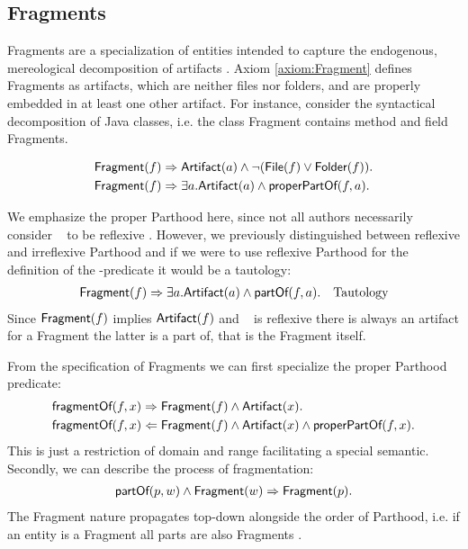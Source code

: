 \subsection{Fragments}
\label{subsection:Fragments}
\Glspl{Fragment} are a specialization of entities intended to capture the endogenous, mereological decomposition of artifacts \cite{HeinzLV17}.
Axiom \ref{axiom:Fragment} defines  \glspl{Fragment} as artifacts, which are neither files nor folders, and are properly embedded in at least one other artifact.
For instance, consider the syntactical decomposition of \gls{Java} classes, i.e. the class \gls{Fragment} contains method and field \glspl{Fragment}.
\begin{axiom}[\Fragment]
\label{axiom:Fragment}
\begin{align*}
&\textsf{Fragment}(f) 
\Rightarrow
\textsf{Artifact}(a) \wedge \neg(\textsf{File}(f) \vee \textsf{Folder}(f)).\\
&\textsf{Fragment}(f) 
\Rightarrow 
\exists a.\textsf{Artifact}(a) \wedge \textsf{properPartOf}(f,a).
\end{align*}
\end{axiom}
We emphasize the proper \gls{Parthood} here, since not all authors necessarily consider \partOf~ to be reflexive \cite{DBLP:conf/sle/Lammel16} \cite{HeinzLV17}.
However, we previously distinguished between reflexive and irreflexive \gls{Parthood} and if we were to use reflexive \gls{Parthood} for the definition of the \Fragment-predicate it would be a tautology:
\begin{align*}
&\textsf{Fragment}(f) 
\Rightarrow 
\exists a.\textsf{Artifact}(a) \wedge \textsf{partOf}(f,a).
&\text{Tautology}
\end{align*}
Since $\textsf{Fragment}(f)$ implies $\textsf{Artifact}(f)$ and \partOf~ is reflexive there is always an artifact for a \gls{Fragment} the latter is a part of, that is the \gls{Fragment} itself.

From the specification of \glspl{Fragment} we can first specialize the proper \gls{Parthood} predicate:
\begin{align*}
&\textsf{fragmentOf}(f,x) 
\Rightarrow
\textsf{Fragment}(f) \wedge \textsf{Artifact}(x).\\
&\textsf{fragmentOf}(f,x) 
\Leftarrow
\textsf{Fragment}(f) \wedge \textsf{Artifact}(x) \wedge \textsf{properPartOf}(f,x).
\end{align*}
This is just a restriction of domain and range facilitating a special semantic.
Secondly, we can describe the process of fragmentation:
\begin{align*}
\textsf{partOf}(p,w) \wedge \textsf{Fragment}(w)
\Rightarrow
\textsf{Fragment}(p).
\end{align*}
The \gls{Fragment} nature propagates top-down alongside the order of \gls{Parthood}, i.e. if an entity is a \gls{Fragment} all parts are also \glspl{Fragment} \cite{HeinzLV17}.

